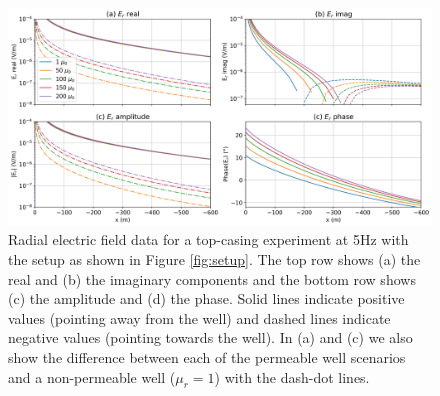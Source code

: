 \begin{figure}
    \begin{center}
    \includegraphics[width=\textwidth]{figures/e-fields-fdem.png}
    \end{center}
\caption{
    Radial electric field data for a top-casing experiment at 5Hz with the setup as shown in Figure \ref{fig:setup}. The top row shows (a) the real and (b) the imaginary components and the bottom row shows (c) the amplitude and (d) the phase. Solid lines indicate positive values (pointing away from the well) and dashed lines indicate negative values (pointing towards the well). In (a) and (c) we also show the difference between each of the permeable well scenarios and a non-permeable well ($\mu_r=1$) with the dash-dot lines.
}
\label{fig:e-fields-fdem}
\end{figure}



